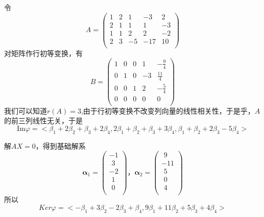 \documentclass[lang=cn,10pt]{elegantbook}
\begin{document}
\begin{solution}
	
	令
	\begin{equation*}
		A=\left(\begin{matrix}1&2&1&-3&2\\2&1&1&1&-3\\1&1&2&2&-2\\2&3&-5&-17&10\\\end{matrix}\right)
	\end{equation*}
	对矩阵作行初等变换，有
	\begin{equation*}
			B=\left( \begin{matrix}
			1&		0&		0&		1&		-\frac{9}{4}\\
			0&		1&		0&		-3&		\frac{11}{4}\\
			0&		0&		1&		2&		-\frac{5}{4}\\
			0&		0&		0&		0&		0\\
		\end{matrix} \right) 
	\end{equation*}
	我们可以知道$r(A)=3$,由于行初等变换不改变列向量的线性相关性，于是乎，$A$的前三列线性无关，于是
	\begin{equation*}
		\mathrm{Im}\varphi =<\beta _1+2\beta _2+\beta _3+2\beta _4,2\beta _1+\beta _2+\beta _3+3\beta _4,\beta _1+\beta _2+2\beta _3-5\beta _4>
	\end{equation*}
	
	解$AX=0$，得到基础解系
	\begin{equation*}
		\boldsymbol{\alpha }_1=\left( \begin{array}{l}
			-1\\
			\,\, 3\\
			-2\\
			\,\, 1\\
			\,\, 0\\
		\end{array} \right) \text{，}\boldsymbol{\alpha }_2=\left( \begin{array}{l}
			\,\,  9\\
			-11\\
			\,\, 5\\
			\,\, 0\\
			\,\, 4\\
		\end{array} \right) 
	\end{equation*}
	所以
	\begin{equation*}
		Ker\varphi =<-\beta _1+3\beta _2-2\beta _3+\beta _4,9\beta _1+11\beta _2+5\beta _3+4\beta _4>
	\end{equation*}
\end{solution}
\end{document}
